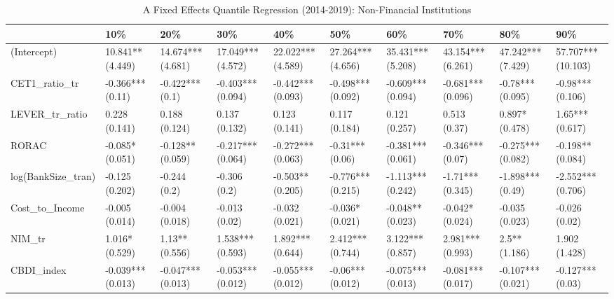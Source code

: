 \begin{table}[ht]
\centering
\caption{A Fixed Effects Quantile Regression (2014-2019): Non-Financial Institutions} 
\begingroup\small
\begin{tabular}{llllllllll}
  \toprule
 & 10\% & 20\% & 30\% & 40\% & 50\% & 60\% & 70\% & 80\% & 90\% \\ 
  \midrule
(Intercept) & 10.841** (4.449) & 14.674*** (4.681) & 17.049*** (4.572) & 22.022*** (4.589) & 27.264*** (4.656) & 35.431*** (5.208) & 43.154*** (6.261) & 47.242*** (7.429) & 57.707*** (10.103) \\ 
  CET1\_ratio\_tr & -0.366*** (0.11) & -0.422*** (0.1) & -0.403*** (0.094) & -0.442*** (0.093) & -0.498*** (0.092) & -0.609*** (0.094) & -0.681*** (0.096) & -0.78*** (0.095) & -0.98*** (0.106) \\ 
  LEVER\_tr\_ratio & 0.228 (0.141) & 0.188 (0.124) & 0.137 (0.132) & 0.123 (0.141) & 0.117 (0.184) & 0.121 (0.257) & 0.513 (0.37) & 0.897* (0.478) & 1.65*** (0.617) \\ 
  RORAC & -0.085* (0.051) & -0.128** (0.059) & -0.217*** (0.064) & -0.272*** (0.063) & -0.31*** (0.06) & -0.381*** (0.061) & -0.346*** (0.07) & -0.275*** (0.082) & -0.198** (0.084) \\ 
  log(BankSize\_tran) & -0.125 (0.202) & -0.244 (0.2) & -0.306 (0.2) & -0.503** (0.205) & -0.776*** (0.215) & -1.113*** (0.242) & -1.71*** (0.345) & -1.898*** (0.49) & -2.552*** (0.706) \\ 
  Cost\_to\_Income & -0.005 (0.014) & -0.004 (0.018) & -0.013 (0.02) & -0.032 (0.021) & -0.036* (0.021) & -0.048** (0.023) & -0.042* (0.024) & -0.035 (0.023) & -0.026 (0.02) \\ 
  NIM\_tr & 1.016* (0.529) & 1.13** (0.556) & 1.538*** (0.593) & 1.892*** (0.644) & 2.412*** (0.744) & 3.122*** (0.857) & 2.981*** (0.993) & 2.5** (1.186) & 1.902 (1.428) \\ 
  CBDI\_index & -0.039*** (0.013) & -0.047*** (0.013) & -0.053*** (0.012) & -0.055*** (0.012) & -0.06*** (0.012) & -0.075*** (0.013) & -0.081*** (0.017) & -0.107*** (0.021) & -0.127*** (0.03) \\ 
   \bottomrule
\end{tabular}
\endgroup
\end{table}
